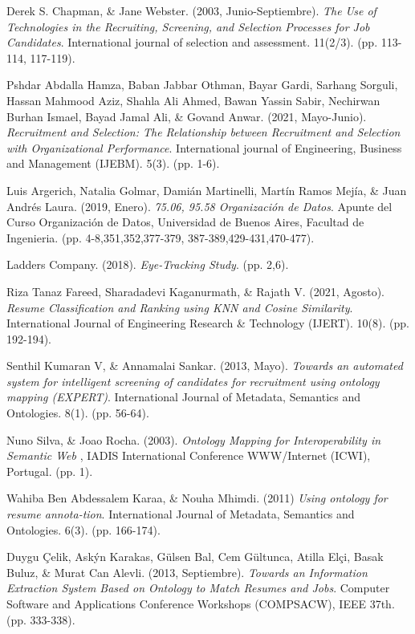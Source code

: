 \documentclass[12pt,a4paper]{article}
\begin{document}
\begin{sloppypar}
\begin{thebibliography}{9}
Derek S. Chapman, \& Jane Webster. (2003, Junio-Septiembre). \textit{The Use of Technologies in the Recruiting, Screening, and Selection Processes for Job Candidates}. International journal of selection and assessment. 11(2/3). (pp. 113-114, 117-119).

Pshdar Abdalla Hamza, Baban Jabbar Othman, Bayar Gardi, Sarhang Sorguli, Hassan Mahmood Aziz, Shahla Ali Ahmed, Bawan Yassin Sabir, Nechirwan Burhan Ismael, Bayad Jamal Ali, \& Govand Anwar. (2021, Mayo-Junio).
\textit{Recruitment and Selection: The Relationship between Recruitment and Selection with Organizational Performance}. International journal of Engineering, Business and Management (IJEBM). 5(3). (pp. 1-6).

Luis Argerich, Natalia Golmar, Damián Martinelli, Martín Ramos Mejía, \& Juan Andrés Laura. (2019, Enero). \textit{75.06, 95.58 Organización de Datos}. Apunte del Curso Organización de Datos, Universidad de Buenos Aires, Facultad de Ingenieria. (pp. 4-8,351,352,377-379, 387-389,429-431,470-477).

Ladders Company. (2018). \textit{Eye-Tracking Study}. (pp. 2,6).

Riza Tanaz Fareed, Sharadadevi Kaganurmath, \& Rajath V. (2021, Agosto). \textit{Resume Classification and Ranking using KNN and Cosine Similarity}. International Journal of Engineering Research \& Technology (IJERT). 10(8). (pp. 192-194).

Senthil Kumaran V, \& Annamalai Sankar. (2013, Mayo). \textit{Towards an automated system for intelligent screening of candidates for recruitment using ontology mapping (EXPERT)}. International Journal of Metadata, Semantics and Ontologies. 8(1). (pp. 56-64).

Nuno Silva, \& Joao Rocha. (2003). \textit{Ontology Mapping for Interoperability in Semantic Web} , IADIS International Conference WWW/Internet (ICWI), Portugal. (pp. 1).

Wahiba Ben Abdessalem Karaa, \& Nouha Mhimdi. (2011) \textit{Using ontology for resume annota-tion}. International Journal of Metadata, Semantics and Ontologies. 6(3). (pp. 166-174).

Duygu Çelik, Askýn Karakas, Gülsen Bal, Cem Gültunca, Atilla Elçi, Basak Buluz, \& Murat Can Alevli. (2013, Septiembre). \textit{Towards an Information Extraction System Based on Ontology to Match Resumes and Jobs}. Computer Software and Applications Conference Workshops (COMPSACW), IEEE 37th. (pp. 333-338).


\end{thebibliography}
\end{sloppypar}
\end{document}
